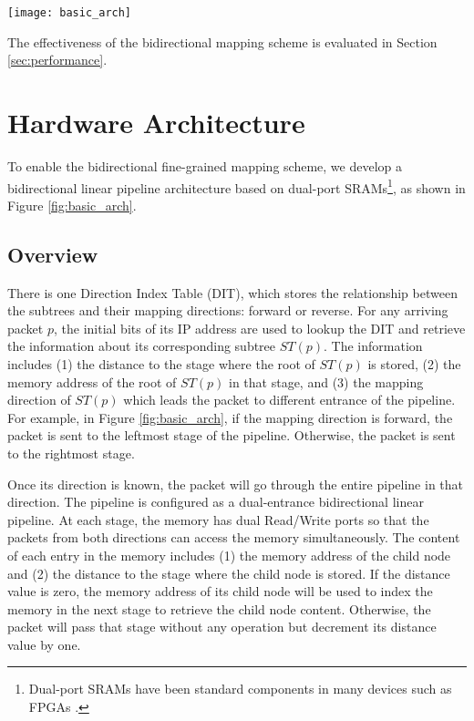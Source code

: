 \documentclass{sigcomm-alternate}
\begin{document}
\begin{figure*}[bht]
\centering
\texttt{[image: basic\_arch]}
\caption{Block diagram of the basic architecture.}
\label{fig:basic_arch}
\end{figure*}

The effectiveness of the bidirectional mapping scheme is evaluated in Section \ref{sec:performance}.



\section{Hardware Architecture}
\label{sec:arch}

To enable the bidirectional fine-grained mapping scheme, we develop a bidirectional linear pipeline architecture based on dual-port SRAMs\footnote{Dual-port SRAMs have been standard components in many devices such as FPGAs \cite{xilinx:virtex}.}, as shown in Figure \ref{fig:basic_arch}.

\subsection{Overview}

There is one Direction Index Table (DIT), which stores the relationship between the subtrees and their mapping directions: forward or reverse. For any arriving packet $p$, the initial bits of its IP address are used to lookup the DIT and retrieve the information about its corresponding subtree $ST(p)$. The information includes (1) the distance to the stage where the root of $ST(p)$ is stored, (2) the memory address of the root of $ST(p)$ in that stage, and (3) the mapping direction of $ST(p)$ which leads the packet to different entrance of the pipeline. For example, in Figure \ref{fig:basic_arch}, if the mapping direction is forward, the packet is sent to the leftmost stage of the pipeline. Otherwise, the packet is sent to the rightmost stage. 

Once its direction is known, the packet will go through the entire pipeline in that direction. The pipeline is configured as a dual-entrance bidirectional linear pipeline. At each stage, the memory has dual Read/Write ports so that the packets from both directions can access the memory simultaneously. The content of each entry in the memory includes (1) the memory address of the child node and (2) the distance to the stage where the child node is stored. If the distance value is zero, the memory address of its child node will be used to index the memory in the next stage to retrieve the child node content. Otherwise, the packet will pass that stage without any operation but decrement its distance value by one.
\end{document}
